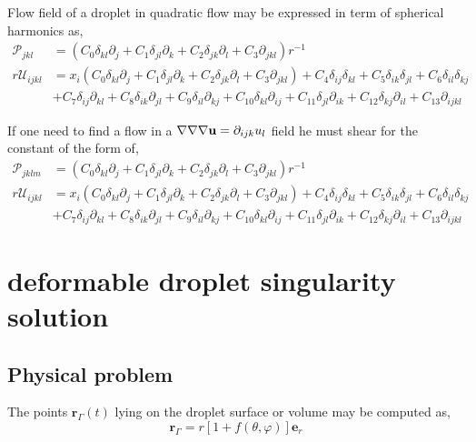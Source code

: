 Flow field of a droplet in quadratic flow may be expressed in term of spherical harmonics as, 
\begin{align}
    \mathcal{P}_{jkl}
    &=
    (C_0 \delta_{kl}\partial_j
    + C_1 \delta_{jl}\partial_k
    + C_2 \delta_{jk}\partial_l
    + C_3 \partial_{jkl})r^{-1}\\
    r \mathcal{U}_{ijkl}
    &=
    x_i 
    (C_0 \delta_{kl}\partial_j
    + C_1 \delta_{jl}\partial_k
    + C_2 \delta_{jk}\partial_l
    + C_3 \partial_{jkl})
    + C_4\delta_{ij}\delta_{kl}
    + C_5\delta_{ik}\delta_{jl}
    + C_6\delta_{il}\delta_{kj}\\
    &
    + C_7\delta_{ij}\partial_{kl}
    + C_8\delta_{ik}\partial_{jl}
    + C_9\delta_{il}\partial_{kj}
    + C_{10}\delta_{kl}\partial_{ij}
    + C_{11}\delta_{jl}\partial_{ik}
    + C_{12}\delta_{kj}\partial_{il}
    + C_{13}\partial_{ijkl}
\end{align}


If one need to find a flow in a $\mathbf{\nabla}\mathbf{\nabla}\mathbf{\nabla} \textbf{u} = \partial_{ijk}u_l$ field he must shear for the constant of the form of, 
\begin{align}
    \mathcal{P}_{jklm}
    &=
    (C_0 \delta_{kl}\partial_j
    + C_1 \delta_{jl}\partial_k
    + C_2 \delta_{jk}\partial_l
    + C_3 \partial_{jkl}
    )r^{-1}\\
    r \mathcal{U}_{ijkl}
    &=
    x_i 
    (C_0 \delta_{kl}\partial_j
    + C_1 \delta_{jl}\partial_k
    + C_2 \delta_{jk}\partial_l
    + C_3 \partial_{jkl})
    + C_4\delta_{ij}\delta_{kl}
    + C_5\delta_{ik}\delta_{jl}
    + C_6\delta_{il}\delta_{kj}\\
    &
    + C_7\delta_{ij}\partial_{kl}
    + C_8\delta_{ik}\partial_{jl}
    + C_9\delta_{il}\partial_{kj}
    + C_{10}\delta_{kl}\partial_{ij}
    + C_{11}\delta_{jl}\partial_{ik}
    + C_{12}\delta_{kj}\partial_{il}
    + C_{13}\partial_{ijkl}
\end{align}

\section{deformable droplet singularity solution}
\subsection{Physical problem}
The points $\textbf{r}_\Gamma(t)$ lying on the droplet surface or volume may be computed as,
\begin{equation}
    \textbf{r}_\Gamma = r [1 + f(\theta,\varphi)]\textbf{e}_r
\end{equation}


